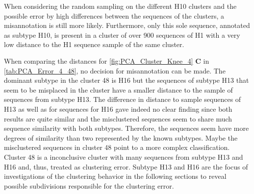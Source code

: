 When considering the random sampling on the different H10 clusters and the possible error by high differences between the sequences of the clusters, a misannotation is still more likely. Furthermore, only this sole sequence, annotated as subtype H10, is present in a cluster of over 900 sequences of H1 with a very low distance to the H1 sequence sample of the same cluster. 

\begin{table}[!hbt]
    \centering
    \caption[Anomalies in Segment 4 Cluster 48 (\Acrshort{PCA})]{\textbf{Anomalies in Segment 4 Cluster 48 (\Acrshort{PCA}).} The \glspl{MSA} mean distance of the given sequences in comparison to a sample of H16 sequences of the same cluster and a sample of H13 sequences present in another cluster. Only the first 20 columns are presented here, the full table can be found in the \href{https://github.com/ahenoch/Masterthesis.git}{Projects GitHub Repository}.}
    \label{tab:PCA_Error_4_48}
\end{table}

When comparing the distances for \autoref{fig:PCA_Cluster_Knee_4} \textbf{\textsf{C}} in \autoref{tab:PCA_Error_4_48}, no decision for misannotation can be made. The dominant subtype in the cluster 48 is H16 but the sequences of subtype H13 that seem to be misplaced in the cluster have a smaller distance to the sample of sequences from subtype H13. The difference in distance to sample sequences of H13 as well as for sequences for H16 gave indeed no clear finding since both results are quite similar and the misclustered sequences seem to share much sequence similarity with both subtypes. Therefore, the sequences seem have more degrees of similarity than two represented by the known subtypes. Maybe the misclustered sequences in cluster 48 point to a more complex classification. Cluster 48 is a inconclusive cluster with many sequences from subtype H13 and H16 and, thus, treated as clustering error. Subtype H13 and H16 are the focus of investigations of the clustering behavior in the following sections to reveal possible subdivisions responsible for the clustering error.

